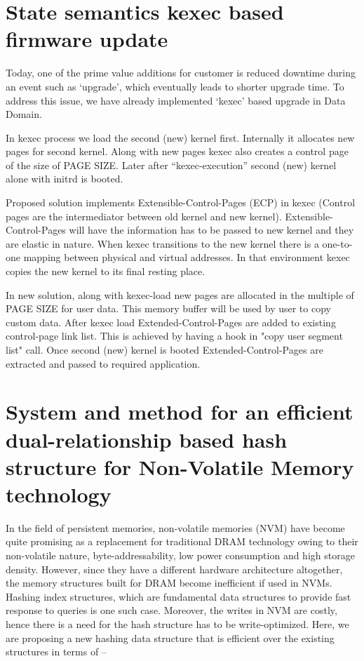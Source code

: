\documentclass{article}
\begin{document}
\section{State semantics kexec based firmware update}

Today, one of the prime value additions for customer is reduced downtime during an event such as ‘upgrade’, which eventually leads to shorter upgrade time. To address this issue, we have already implemented ‘kexec’ based upgrade in Data Domain.

In kexec process we load the second (new) kernel first. Internally it allocates new pages for second kernel. Along with new pages kexec also creates a control page of the size of PAGE SIZE. Later after “kexec-execution” second (new) kernel alone with initrd is booted.

Proposed solution implements Extensible-Control-Pages (ECP) in kexec (Control pages are the intermediator between old kernel and new kernel). Extensible-Control-Pages will have the information has to be passed to new kernel and they are elastic in nature. 
When kexec transitions to the new kernel there is a one-to-one mapping between physical and virtual addresses. In that environment kexec copies the new kernel to its final resting place.  

In new solution, along with kexec-load new pages are allocated in the multiple of PAGE SIZE for user data. This memory buffer will be used by user to copy custom data. After kexec load Extended-Control-Pages are added to existing control-page link list. This is achieved by having a hook in "copy user segment list" call. Once second (new) kernel is booted Extended-Control-Pages are extracted and passed to required application.


\section{System and method for an efficient dual-relationship based hash structure for Non-Volatile Memory technology}

In the field of persistent memories, non-volatile memories (NVM) have become quite promising as a replacement for traditional DRAM technology owing to their non-volatile nature, byte-addressability, low power consumption and high storage density. 
However, since they have a different hardware architecture altogether, the memory structures built for DRAM become inefficient if used in NVMs. Hashing index structures, which are fundamental data structures to provide fast response to queries is one such case. Moreover, the writes in NVM are costly, hence there is a need for the hash structure has to be write-optimized. 
Here, we are proposing a new hashing data structure that is efficient over the existing structures in terms of – 
\end{document}
